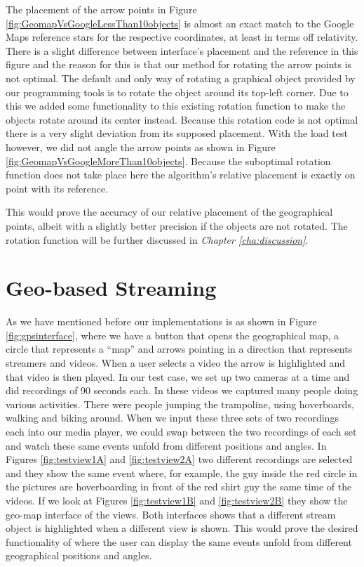 The placement of the arrow points in Figure \ref{fig:GeomapVsGoogleLessThan10objects} is almost an exact match to the Google Maps reference stars for the respective coordinates, at least in terms off relativity. There is a slight difference between interface's placement and the reference in this figure and the reason for this is that our method for rotating the arrow points is not optimal. The default and only way of rotating a graphical object provided by our programming tools is to rotate the object around its top-left corner. Due to this we added some functionality to this existing rotation function to make the objects rotate around its center instead. Because this rotation code is not optimal there is a very slight deviation from its supposed placement. With the load test however, we did not angle the arrow points as shown in Figure \ref{fig:GeomapVsGoogleMoreThan10objects}. Because the suboptimal rotation function does not take place here the algorithm's relative placement is exactly on point with its reference.

This would prove the accuracy of our relative placement of the geographical points, albeit with a slightly better precision if the objects are not rotated. The rotation function will be further discussed in \textit{Chapter \ref{cha:discussion}}.

\section{Geo-based Streaming}
\label{sec:geobasedstreaming}

As we have mentioned before our implementations is as shown in Figure \ref{fig:gpsinterface}, where we have a button that opens the geographical map, a circle that represents a “map” and arrows pointing in a direction that represents streamers and videos. When a user selects a video the arrow is highlighted and that video is then played. In our test case, we set up two cameras at a time and did recordings of 90 seconds each. In these videos we captured many people doing various activities. There were people jumping the trampoline, using hoverboards, walking and biking around. When we input these three sets of two recordings each into our media player, we could swap between the two recordings of each set and watch these same events unfold from different positions and angles. In Figures \ref{fig:testview1A} and \ref{fig:testview2A} two different recordings are selected and they show the same event where, for example, the guy inside the red circle in the pictures are hoverboarding in front of the red shirt guy the same time of the videos. If we look at Figures \ref{fig:testview1B} and \ref{fig:testview2B} they show the geo-map interface of the views. Both interfaces shows that a different stream object is highlighted when a different view is shown. This would prove the desired functionality of where the user can display the same events unfold from different geographical positions and angles.

